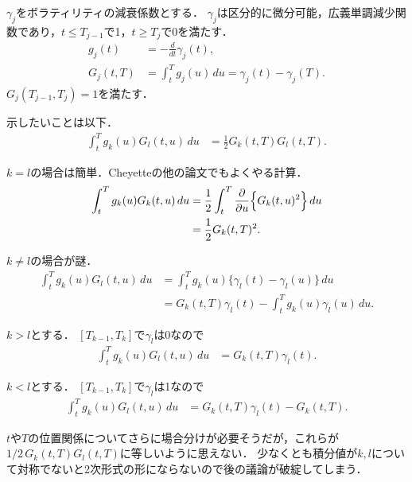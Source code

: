 \documentclass[11pt,a4paper]{jsarticle}
\begin{document}
$\gamma_j$をボラティリティの減衰係数とする．
$\gamma_j$は区分的に微分可能，広義単調減少関数であり，$t \leq T_{j-1}$で1，$t \geq T_{j}$で0を満たす．
\begin{align}
g_j (t)
& =
-\frac{d}{d t} \gamma_j (t), \nonumber \\
G_j (t, T)
& =
\int_t^T g_j (u) \, du = \gamma_j (t) - \gamma_j (T). \nonumber
\end{align}
$G_j (T_{j-1}, T_{j}) = 1$を満たす．

示したいことは以下．
\begin{align}
\int_t^T g_k (u) G_l (t, u) \, du
& =
\frac{1}{2} G_k (t, T) G_l (t, T). \nonumber
\end{align}

$k = l$の場合は簡単．Cheyetteの他の論文でもよくやる計算．
\begin{align}
\int_t^T g_k (u) G_k (t, u) \, du
& =
\frac{1}{2} \int_t^T \frac{\partial}{\partial u} \Bigl\{ G_k (t, u)^2 \Bigr\} \, du \nonumber \\
& =
\frac{1}{2} G_k (t, T)^2. \nonumber
\end{align}

$k \neq l$の場合が謎．
\begin{align}
\int_t^T g_k (u) G_l (t, u) \, du
& =
\int_t^T g_k (u) \bigl\{ \gamma_l (t) - \gamma_l (u) \bigr\} \, du \nonumber \\
& =
G_k (t, T) \gamma_l (t) - \int_t^T g_k (u) \gamma_l (u) \, du. \nonumber
\end{align}

$k > l$とする．
$[T_{k-1}, T_{k}]$で$\gamma_l$は0なので
\begin{align}
\int_t^T g_k (u) G_l (t, u) \, du
& =
G_k (t, T) \gamma_l (t). \nonumber
\end{align}

$k < l$とする．
$[T_{k-1}, T_{k}]$で$\gamma_l$は1なので
\begin{align}
\int_t^T g_k (u) G_l (t, u) \, du
& =
G_k (t, T) \gamma_l (t) - G_k (t, T). \nonumber
\end{align}

$t$や$T$の位置関係についてさらに場合分けが必要そうだが，これらが$1/2 \, G_k (t, T) G_l (t, T)$に等しいように思えない．
少なくとも積分値が$k, l$について対称でないと2次形式の形にならないので後の議論が破綻してしまう．
\end{document}
